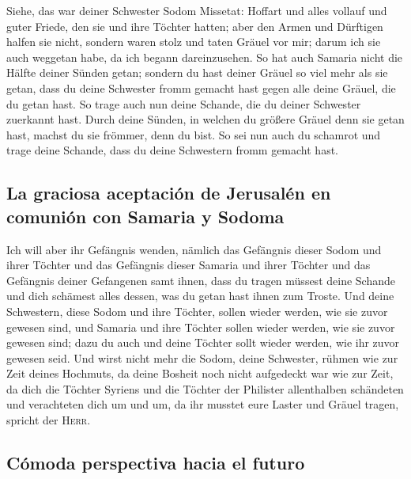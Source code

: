  Siehe, das war deiner Schwester Sodom Missetat: Hoffart
und alles vollauf und guter Friede, den sie und ihre Töchter hatten;
aber den Armen und Dürftigen halfen sie nicht,  sondern
waren stolz und taten Gräuel vor mir; darum ich sie auch weggetan habe,
da ich begann dareinzusehen.  So hat auch Samaria nicht
die Hälfte deiner Sünden getan; sondern du hast deiner Gräuel so viel
mehr als sie getan, dass du deine Schwester fromm gemacht hast gegen
alle deine Gräuel, die du getan hast.  So trage auch nun
deine Schande, die du deiner Schwester zuerkannt hast. Durch deine
Sünden, in welchen du größere Gräuel denn sie getan hast, machst du sie
frömmer, denn du bist. So sei nun auch du schamrot und trage deine
Schande, dass du deine Schwestern fromm gemacht hast.

\hypertarget{la-graciosa-aceptaciuxf3n-de-jerusaluxe9n-en-comuniuxf3n-con-samaria-y-sodoma}{%
\subsection{La graciosa aceptación de Jerusalén en comunión con Samaria
y
Sodoma}\label{la-graciosa-aceptaciuxf3n-de-jerusaluxe9n-en-comuniuxf3n-con-samaria-y-sodoma}}

 Ich will aber ihr Gefängnis wenden, nämlich das
Gefängnis dieser Sodom und ihrer Töchter und das Gefängnis dieser
Samaria und ihrer Töchter und das Gefängnis deiner Gefangenen samt
ihnen,  dass du tragen müssest deine Schande und dich
schämest alles dessen, was du getan hast ihnen zum Troste.
 Und deine Schwestern, diese Sodom und ihre Töchter,
sollen wieder werden, wie sie zuvor gewesen sind, und Samaria und ihre
Töchter sollen wieder werden, wie sie zuvor gewesen sind; dazu du auch
und deine Töchter sollt wieder werden, wie ihr zuvor gewesen seid.
 Und wirst nicht mehr die Sodom, deine Schwester, rühmen
wie zur Zeit deines Hochmuts,  da deine Bosheit noch
nicht aufgedeckt war wie zur Zeit, da dich die Töchter Syriens und die
Töchter der Philister allenthalben schändeten und verachteten dich um
und um,  da ihr musstet eure Laster und Gräuel tragen,
spricht der \textsc{Herr}.

\hypertarget{cuxf3moda-perspectiva-hacia-el-futuro}{%
\subsection{Cómoda perspectiva hacia el
futuro}\label{cuxf3moda-perspectiva-hacia-el-futuro}}


